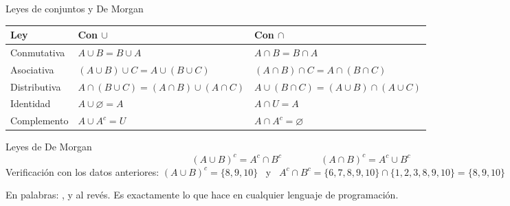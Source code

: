 \documentclass[aspectratio=169,10pt]{beamer}
\begin{document}
\begin{frame}{Leyes de conjuntos y De Morgan}
  \scriptsize
  \begin{center}
  \begin{tabular}{@{}p{2.6cm}p{4.4cm}p{4.6cm}@{}}
    \toprule
    \textbf{Ley} & \textbf{Con $\cup$} & \textbf{Con $\cap$} \\
    \midrule
    Conmutativa & $A\cup B = B\cup A$ & $A\cap B = B\cap A$ \\
    Asociativa & $(A\cup B)\cup C = A\cup(B\cup C)$ &
      $(A\cap B)\cap C = A\cap(B\cap C)$ \\
    Distributiva & $A\cap(B\cup C) = (A\cap B)\cup(A\cap C)$ &
      $A\cup(B\cap C) = (A\cup B)\cap(A\cup C)$ \\
    Identidad & $A\cup\varnothing = A$ & $A\cap U = A$ \\
    Complemento & $A\cup A^{c} = U$ & $A\cap A^{c} = \varnothing$ \\
    \bottomrule
  \end{tabular}
  \end{center}

  \vspace{0.1cm}
  \begin{exampleblock}{Leyes de De Morgan}
    \scriptsize
    \[ (A\cup B)^{c} = A^{c}\cap B^{c} \qquad\qquad
       (A\cap B)^{c} = A^{c}\cup B^{c} \]
    Verificación con los datos anteriores:
    $(A\cup B)^c = \{8,9,10\}$ \ y \ $A^c\cap B^c
    = \{6,7,8,9,10\}\cap\{1,2,3,8,9,10\} = \{8,9,10\}$ \checkmark
  \end{exampleblock}

  \vspace{0.05cm}
  {\tiny\color{uniGris} En palabras: , y al revés. Es exactamente lo que hace  en cualquier lenguaje de programación.}
\end{frame}
\end{document}
